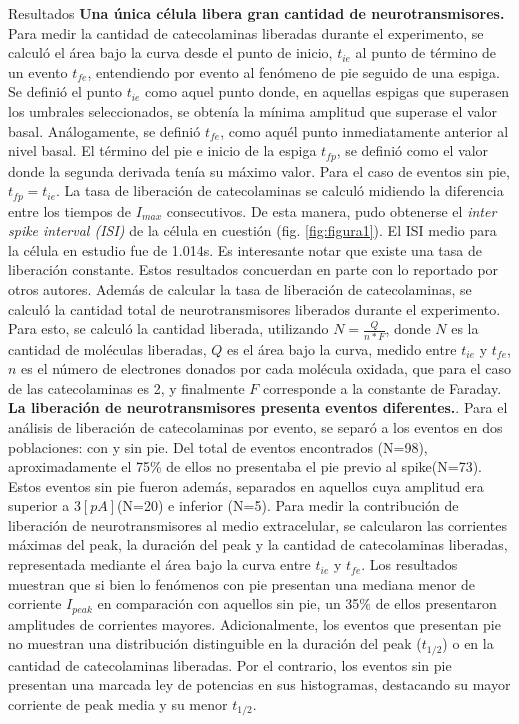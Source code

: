 \documentclass[twocolumn]{article}
\makeatletter
\def\section{\@startsection {section}{1}{\z@}{24pt plus 2pt minus 2pt}
{12pt plus 2pt minus 2pt}{\large\bf}}
\makeatother
\begin{document}
\section{Resultados}
{\bf Una única célula libera gran cantidad de neurotransmisores.} Para medir la cantidad de catecolaminas liberadas durante el experimento, se calculó el área bajo la curva desde el punto de inicio, $t_{ie}$ al punto de término de un evento $t_{fe}$, entendiendo por evento al fenómeno de pie seguido de una espiga.  Se definió el punto $t_{ie}$ como aquel punto donde, en aquellas espigas que superasen los umbrales seleccionados, se obtenía la mínima amplitud que superase el valor basal.  Análogamente, se definió $t_{fe}$, como aquél punto inmediatamente anterior al nivel basal. El término del pie e inicio de la espiga $t_{fp}$, se definió como el valor donde la segunda derivada tenía su máximo valor\citep{evanko2005primer}.  Para el caso de eventos sin pie, $t_{fp} = t_{ie}$.
La tasa de liberación de catecolaminas se calculó midiendo la diferencia entre los tiempos de $I_{max}$ consecutivos.  De esta manera, pudo obtenerse el \textit{inter spike interval (ISI)} de la célula en cuestión (fig. \ref{fig:figura1}). El ISI medio para la célula en estudio fue de 1.014s.  
Es interesante notar que existe una tasa de liberación constante. Estos resultados concuerdan en parte con lo reportado por otros autores\citep{jarukanont2015vesicle}.  
Además de calcular la tasa de liberación de catecolaminas, se calculó la cantidad total de neurotransmisores liberados durante el experimento.  Para esto, se calculó la cantidad liberada, utilizando $N = \frac{Q}{n*F}$, donde $N$ es la cantidad de moléculas liberadas, $Q$ es el área bajo la curva, medido entre $t_{ie}$ y $t_{fe}$, $n$ es el número de electrones donados por cada molécula oxidada, que para el caso de las catecolaminas es 2, y finalmente $F$ corresponde a la constante de Faraday\citep{evanko2005primer}.
{\bf La liberación de neurotransmisores presenta eventos diferentes.}. Para el análisis de liberación de catecolaminas por evento, se separó a los eventos en dos poblaciones: con y sin pie.  Del total de eventos encontrados (N=98), aproximadamente el 75\% de ellos no presentaba el pie previo al spike(N=73).  Estos eventos sin pie fueron además, separados en aquellos cuya amplitud era superior a $3[pA]$(N=20) e inferior (N=5).
Para medir la contribución de liberación de neurotransmisores al medio extracelular, se calcularon las corrientes máximas del peak, la duración del peak y la cantidad de catecolaminas liberadas, representada mediante el área bajo la curva entre $t_{ie}$ y $t_{fe}$. Los resultados muestran que si bien lo fenómenos con pie presentan una mediana menor de corriente $I_{peak}$ en comparación con aquellos sin pie, un 35\% de ellos presentaron amplitudes de corrientes mayores.  Adicionalmente, los eventos que presentan pie no muestran una distribución distinguible en la duración del peak ($t_{1/2}$) o en la cantidad de catecolaminas liberadas.
Por el contrario, los eventos sin pie presentan una marcada ley de potencias en sus histogramas, destacando su mayor corriente de peak media y su menor $t_{1/2}$.
\end{document}
